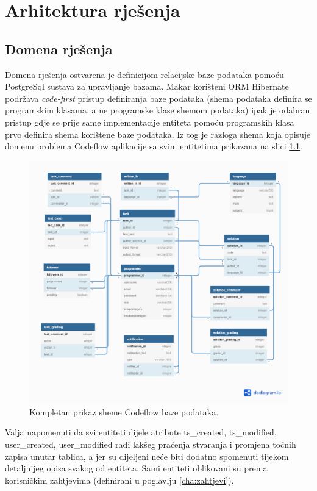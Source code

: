 \documentclass[times, utf8, zavrsni, numeric]{fer}
\begin{document}
	\chapter{Arhitektura rješenja}
		\section{Domena rješenja}
		\label{sec:domenarjesenja}
		Domena rješenja ostvarena je definicijom relacijske baze podataka pomoću PostgreSql sustava za upravljanje bazama. Makar korišteni ORM Hibernate podržava \textit{code-first} pristup definiranja baze podataka (shema podataka definira se programskim klasama, a ne programske klase shemom podataka) ipak je odabran pristup gdje se prije same implementacije entiteta pomoću programskih klasa prvo definira shema korištene baze podataka. Iz tog je razloga shema koja opisuje domenu problema Codeflow aplikacije sa svim entitetima prikazana na slici \ref{fig:db}.
		\begin{figure}[H]
			\centering
			\includegraphics[width=\linewidth]{pictures/prikazi/Database.png}
			\caption{Kompletan prikaz sheme Codeflow baze podataka.}
			\label{fig:db}
		\end{figure}
		Valja napomenuti da svi entiteti dijele atribute ts\_created, ts\_modified, user\_created, user\_modified radi lakšeg praćenja stvaranja i promjena točnih zapisa unutar tablica, a jer su dijeljeni neće biti dodatno spomenuti tijekom detaljnijeg opisa svakog od entiteta. Sami entiteti oblikovani su prema korisničkim zahtjevima (definirani u poglavlju \ref{cha:zahtjevi}).
\end{document}
